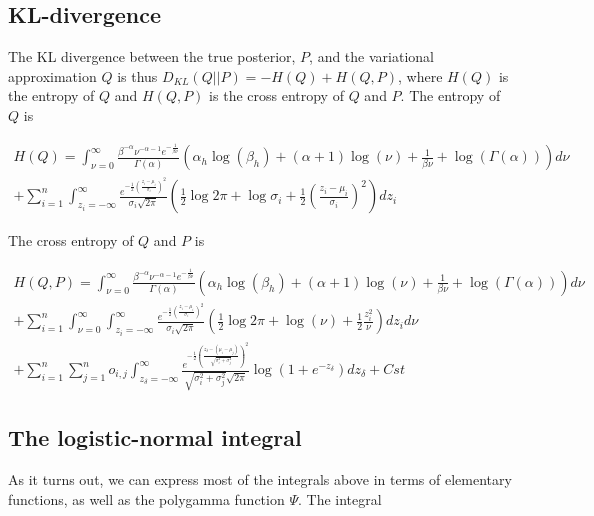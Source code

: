 \documentclass[12pt]{article}
\begin{document}
\subsection{KL-divergence}

The KL divergence between the true posterior, $P$, and the variational approximation $Q$ is thus $D_{KL}(Q||P) = - H(Q) + H(Q,P)$,
where $H(Q)$ is the entropy of $Q$ and $H(Q,P)$ is the cross entropy of $Q$ and $P$. The entropy of $Q$ is

\begin{multline*}
    H(Q) = \int_{\nu=0}^{\infty} \frac{\beta^{-\alpha}\nu^{-\alpha-1}e^{-\frac{1}{\beta \nu}}}{\Gamma(\alpha) }
    \left(\alpha_h \log(\beta_h) + (\alpha+1)\log(\nu) + \frac{1}{\beta \nu} + \log(\Gamma(\alpha))\right)
    d\nu \\
    + \sum_{i=1}^n \int_{z_i=-\infty}^{\infty} \frac{e^{-\frac{1}{2}\left(\frac{z_i-\mu_i}{\sigma_i}\right)^2}}{\sigma_i \sqrt{2 \pi}}
    \left(\frac{1}{2} \log{2\pi} + \log{\sigma_i} + \frac{1}{2}\left(\frac{z_i-\mu_i}{\sigma_i}\right)^2\right) dz_i
\end{multline*}


The cross entropy of $Q$ and $P$ is

\begin{multline*}
    H(Q,P) = \int_{\nu=0}^{\infty} \frac{\beta^{-\alpha}\nu^{-\alpha-1}e^{-\frac{1}{\beta \nu}}}{\Gamma(\alpha)}
\left(\alpha_h \log(\beta_h) + (\alpha+1)\log(\nu) + \frac{1}{\beta \nu} + \log(\Gamma(\alpha))\right) d\nu
\\
+ \sum_{i=1}^n \int_{\nu=0}^{\infty} \int_{z_i=-\infty}^{\infty} \frac{e^{-\frac{1}{2}\left(\frac{z_i-\mu_i}{\sigma_i}\right)^2}}{\sigma_i \sqrt{2 \pi}} \left(
\frac{1}{2} \log{2\pi} + \log(\nu) + \frac{1}{2}\frac{z_i^2}{\nu}
\right)dz_i d\nu\\
+ \sum_{i=1}^n\sum_{j=1}^n o_{i,j} \int_{z_\delta=-\infty}^{\infty}
\frac{e^{-\frac{1}{2}\left(\frac{z_\delta - (\mu_i - \mu_j)}{\sqrt{\sigma_i^2 + \sigma_j^2}}\right)^2}}{\sqrt{\sigma_i^2 + \sigma_j^2} \sqrt{2 \pi}} \log\left(1 + e^{-z_\delta}\right) dz_\delta +
Cst
\end{multline*}


\subsection{The logistic-normal integral}

As it turns out, we can express most of the integrals above in terms of elementary functions, as well as the polygamma function $\Psi$.
The integral
\end{document}
